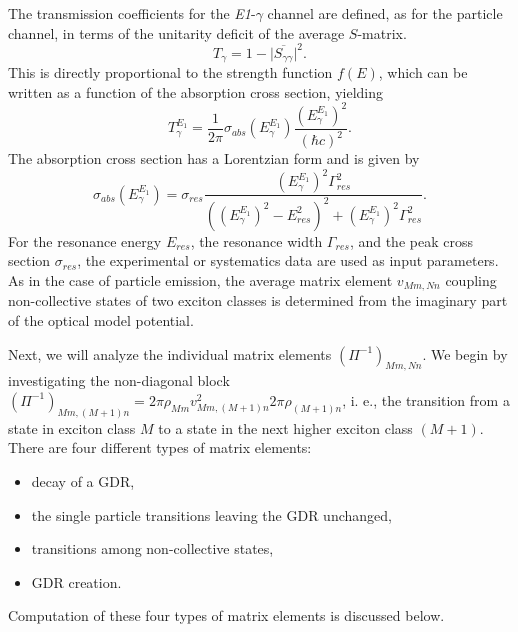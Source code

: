 \documentclass[twocolumn,amsmath,amssymb,10pt,groupedaddress,letter]{revtex4}
\begin{document}
The transmission coefficients for the \emph{E1}-$\gamma$ channel
are defined, as for the particle channel, in terms of the unitarity
deficit of the average $S$-matrix. \begin{equation}
T_{\gamma}=1-\Big|\overline{S_{\gamma\gamma}}\Big|^{2}.\end{equation}
This is directly proportional to the strength function $f(E)$, which
can be written as a function of the absorption cross section, yielding
\begin{equation}
T_{\gamma}^{E_{1}}=\frac{1}{2\pi}\sigma_{abs}(E_{\gamma}^{E_{1}})\frac{(E_{\gamma}^{E_{1}})^{2}}{(\hbar c)^{2}}.\end{equation}
The absorption cross section has a Lorentzian form and is given by
\begin{equation}
\sigma_{abs}(E_{\gamma}^{E_{1}})=\sigma_{res}\frac{(E_{\gamma}^{E_{1}})^{2}\Gamma_{res}^{2}}{((E_{\gamma}^{E_{1}})^{2}-E_{res}^{2})^{2}+(E_{\gamma}^{E_{1}})^{2}\Gamma_{res}^{2}}.\end{equation}
For the resonance energy $E_{res}$, the resonance width $\Gamma_{res}$,
and the peak cross section $\sigma_{res}$, the experimental or systematics
data are used as input parameters. As in the case of particle emission,
the average matrix element $v_{Mm,Nn}$ coupling non-collective states
of two exciton classes is determined from the imaginary part of the
optical model potential.

Next, we will analyze the individual matrix elements $(\Pi^{-1})_{Mm,Nn}$.
We begin by investigating the non-diagonal block $(\Pi^{-1})_{Mm,(M+1)n}=2\pi\rho_{Mm}v_{Mm,(M+1)n}^{2}2\pi\rho_{(M+1)n}$,
i. e., the transition from a state in exciton class $M$ to a state
in the next higher exciton class $(M+1)$. There are four different
types of matrix elements:

\begin{itemize}
\item decay of a GDR,
\item the single particle transitions leaving the GDR unchanged,
\item transitions among non-collective states,
\item GDR creation.
\end{itemize}
Computation of these four types of matrix elements is discussed below.
\end{document}
